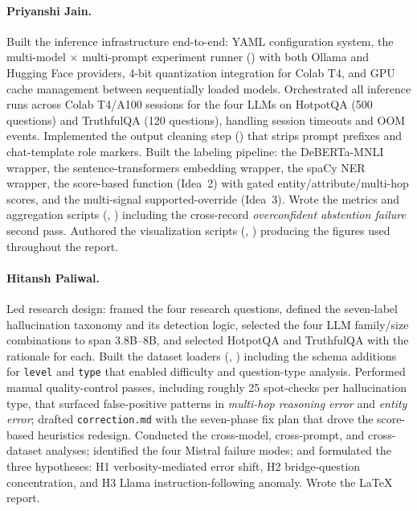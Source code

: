 \documentclass[11pt,a4paper]{article}
\newcommand{\lbl}[1]{\textit{#1}}
\begin{document}
\paragraph{Priyanshi Jain.} Built the inference infrastructure end-to-end: YAML configuration system, the multi-model $\times$ multi-prompt experiment runner () with both Ollama and Hugging Face providers, 4-bit quantization integration for Colab T4, and GPU cache management between sequentially loaded models. Orchestrated all inference runs across Colab T4/A100 sessions for the four LLMs on HotpotQA (500 questions) and TruthfulQA (120 questions), handling session timeouts and OOM events. Implemented the output cleaning step () that strips prompt prefixes and chat-template role markers. Built the labeling pipeline: the DeBERTa-MNLI wrapper, the sentence-transformers embedding wrapper, the spaCy NER wrapper, the score-based  function (Idea~2) with gated entity/attribute/multi-hop scores, and the multi-signal supported-override (Idea~3). Wrote the metrics and aggregation scripts (, ) including the cross-record \lbl{overconfident abstention failure} second pass. Authored the visualization scripts (, ) producing the figures used throughout the report.

\paragraph{Hitansh Paliwal.} Led research design: framed the four research questions, defined the seven-label hallucination taxonomy and its detection logic, selected the four LLM family/size combinations to span 3.8B--8B, and selected HotpotQA and TruthfulQA with the rationale for each. Built the dataset loaders (, ) including the schema additions for \texttt{level} and \texttt{type} that enabled difficulty and question-type analysis. Performed manual quality-control passes, including roughly 25 spot-checks per hallucination type, that surfaced false-positive patterns in \lbl{multi-hop reasoning error} and \lbl{entity error}; drafted \texttt{correction.md} with the seven-phase fix plan that drove the score-based heuristics redesign. Conducted the cross-model, cross-prompt, and cross-dataset analyses; identified the four Mistral failure modes; and formulated the three hypotheses: H1 verbosity-mediated error shift, H2 bridge-question concentration, and H3 Llama instruction-following anomaly. Wrote the LaTeX report.
\end{document}
